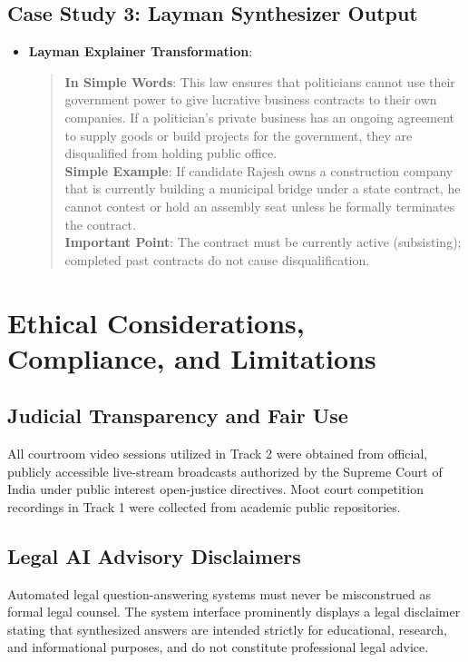 \documentclass{llncs}
\begin{document}
\subsection{Case Study 3: Layman Synthesizer Output}
\begin{itemize}
    \item \textbf{Layman Explainer Transformation}:
    \begin{quote}
    \small
    \textbf{In Simple Words}: This law ensures that politicians cannot use their government power to give lucrative business contracts to their own companies. If a politician's private business has an ongoing agreement to supply goods or build projects for the government, they are disqualified from holding public office.\\
    \textbf{Simple Example}: If candidate Rajesh owns a construction company that is currently building a municipal bridge under a state contract, he cannot contest or hold an assembly seat unless he formally terminates the contract.\\
    \textbf{Important Point}: The contract must be currently active (subsisting); completed past contracts do not cause disqualification.
    \end{quote}
\end{itemize}


\section{Ethical Considerations, Compliance, and Limitations}
\label{sec:ethics}

\subsection{Judicial Transparency and Fair Use}
All courtroom video sessions utilized in Track 2 were obtained from official, publicly accessible live-stream broadcasts authorized by the Supreme Court of India under public interest open-justice directives. Moot court competition recordings in Track 1 were collected from academic public repositories.

\subsection{Legal AI Advisory Disclaimers}
Automated legal question-answering systems must never be misconstrued as formal legal counsel. The system interface prominently displays a legal disclaimer stating that synthesized answers are intended strictly for educational, research, and informational purposes, and do not constitute professional legal advice.
\end{document}
